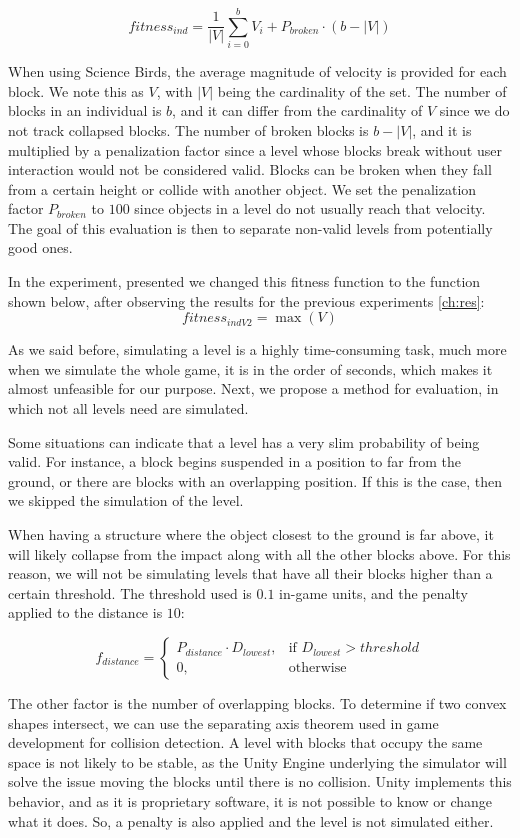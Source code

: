 \documentclass[a4paper,twoside]{article}
\begin{document}
$$fitness_{ind} = \frac{1}{|V|}\sum_{i=0}^{b}{V_i} + P_{broken}\cdot(b-|V|)$$

When using Science Birds, the average magnitude of velocity is provided for each block. We note this as $V$, with $|V|$ being the cardinality of the set. The number of blocks in an individual is $b$, and it can differ from the cardinality of $V$ since we do not track collapsed blocks. The number of broken blocks is $b-|V|$, and it is multiplied by a penalization factor since a level whose blocks break without user interaction would not be considered valid.  Blocks can be broken when they fall from a certain height or collide with another object. We set the penalization factor $P_{broken}$ to $100$ since objects in a level do not usually reach that  velocity.  The goal of this evaluation is then to separate non-valid levels from potentially good ones.

In the experiment, presented we changed this fitness function to the function shown below, after observing the results for the previous experiments \ref{ch:res}: 
$$fitness_{indV2} = \max{(V)}$$

As we said before, simulating a level is a highly time-consuming task, much more when we simulate the whole game, it is in the order of seconds, which makes it almost unfeasible for our purpose. Next, we propose a method for evaluation, in which not all levels need are simulated.

Some situations can indicate that a level has a very slim probability of being valid.  For instance, a block begins suspended in a position to far from the ground, or there are blocks with an overlapping position. If this is the case, then we skipped the simulation of the level. 

When having a structure where the object closest to the ground is far above, it will likely collapse from the impact along with all the other blocks above. For this reason, we will not be simulating levels that have all their blocks higher than a  certain threshold. The threshold used is $0.1$ in-game units, and the penalty applied to the distance is $10$:

$$f_{distance} = 
\begin{cases}
P_{distance}\cdot D_{lowest}, & \text{if } D_{lowest} > threshold\\
0, & \text{otherwise}
\end{cases}
$$


The other factor is the number of overlapping blocks. To determine if two convex shapes intersect, we can use the separating axis theorem \cite{ericson2004real}  used in game development for collision detection. A level with blocks that occupy the same space is not likely to be stable, as the Unity Engine underlying the simulator will solve the issue moving the blocks until there is no collision. Unity implements this behavior, and as it is proprietary software, it is not possible to know or change what it does. So, a penalty is also applied and the level is not simulated either. 
\end{document}
